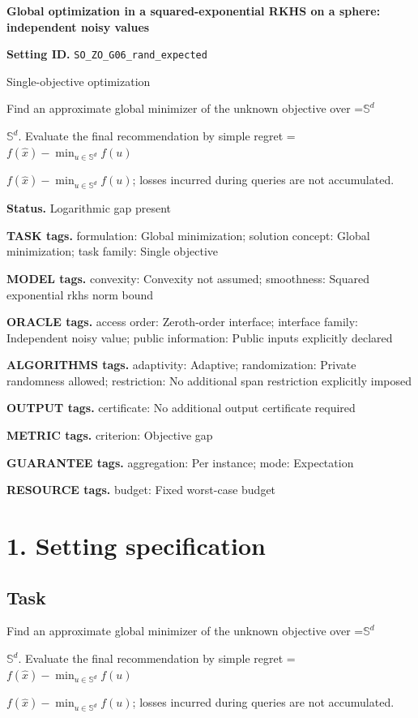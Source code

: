 \documentclass[10pt,a4paper]{article}
\newcommand{\AtlasMath}[1]{\par\begingroup\centering\setbox0=\hbox{$\displaystyle #1$}\ifdim\wd0>1.4\linewidth\typeout{ATLAS WIDE FORMULA: \the\wd0}\fi\ifdim\wd0>\linewidth\resizebox{\linewidth}{!}{\box0}\else\box0\fi\par\endgroup}
\newcommand{\AtlasInlineMath}[1]{\begingroup\setbox0=\hbox{$#1$}\ifdim\wd0>.4\linewidth\endgroup\AtlasMath{#1}\else\endgroup$#1$\fi}
\begin{document}
\raggedright

{\LARGE\bfseries\sffamily\color{AtlasNavy} Global optimization in a squared-exponential RKHS on a sphere: independent noisy values\par}\vspace{5pt}
\textbf{Setting ID.} \texttt{SO\_\allowbreak{}ZO\_\allowbreak{}G06\_\allowbreak{}rand\_\allowbreak{}expected}

Single-objective optimization

Find an approximate global minimizer of the unknown objective over \AtlasInlineMath{\mathbb{S}^d}. Evaluate the final recommendation by simple regret \AtlasInlineMath{f(\widehat{x})-\min_{u\in \mathbb{S}^d}f(u)}; losses incurred during queries are not accumulated.

\textbf{Status.} Logarithmic gap present

\textbf{TASK tags.} formulation: Global minimization; solution concept: Global minimization; task family: Single objective

\textbf{MODEL tags.} convexity: Convexity not assumed; smoothness: Squared exponential rkhs norm bound

\textbf{ORACLE tags.} access order: Zeroth-order interface; interface family: Independent noisy value; public information: Public inputs explicitly declared

\textbf{ALGORITHMS tags.} adaptivity: Adaptive; randomization: Private randomness allowed; restriction: No additional span restriction explicitly imposed

\textbf{OUTPUT tags.} certificate: No additional output certificate required

\textbf{METRIC tags.} criterion: Objective gap

\textbf{GUARANTEE tags.} aggregation: Per instance; mode: Expectation

\textbf{RESOURCE tags.} budget: Fixed worst-case budget

\section{1. Setting specification}
\subsection{Task}
Find an approximate global minimizer of the unknown objective over \AtlasInlineMath{\mathbb{S}^d}. Evaluate the final recommendation by simple regret \AtlasInlineMath{f(\widehat{x})-\min_{u\in \mathbb{S}^d}f(u)}; losses incurred during queries are not accumulated.
\end{document}
